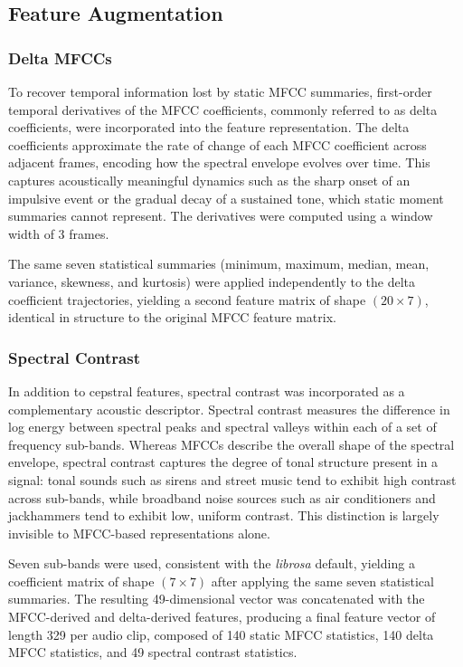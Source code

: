 \documentclass[runningheads,a4paper,11pt]{report}
\begin{document}
\subsection{Feature Augmentation}
\label{section:featureAugmentation}

\subsubsection{Delta MFCCs}

To recover temporal information lost by static MFCC summaries, first-order temporal derivatives of the MFCC coefficients, commonly referred to as delta coefficients, were incorporated into the feature representation. The delta coefficients approximate the rate of change of each MFCC coefficient across adjacent frames, encoding how the spectral envelope evolves over time. This captures acoustically meaningful dynamics such as the sharp onset of an impulsive event or the gradual decay of a sustained tone, which static moment summaries cannot represent. The derivatives were computed using a window width of 3 frames.

The same seven statistical summaries (minimum, maximum, median, mean, variance, skewness, and kurtosis) were applied independently to the delta coefficient trajectories, yielding a second feature matrix of shape $(20 \times 7)$, identical in structure to the original MFCC feature matrix.

\subsubsection{Spectral Contrast}

In addition to cepstral features, spectral contrast was incorporated as a complementary acoustic descriptor. Spectral contrast measures the difference in log energy between spectral peaks and spectral valleys within each of a set of frequency sub-bands. Whereas MFCCs describe the overall shape of the spectral envelope, spectral contrast captures the degree of tonal structure present in a signal: tonal sounds such as sirens and street music tend to exhibit high contrast across sub-bands, while broadband noise sources such as air conditioners and jackhammers tend to exhibit low, uniform contrast. This distinction is largely invisible to MFCC-based representations alone.

Seven sub-bands were used, consistent with the \textit{librosa} default, yielding a coefficient matrix of shape $(7 \times 7)$ after applying the same seven statistical summaries. The resulting 49-dimensional vector was concatenated with the MFCC-derived and delta-derived features, producing a final feature vector of length 329 per audio clip, composed of 140 static MFCC statistics, 140 delta MFCC statistics, and 49 spectral contrast statistics.
\end{document}
